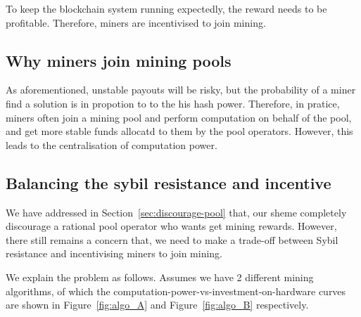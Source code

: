 To keep the blockchain system running expectedly, the reward needs to be profitable.
Therefore, miners are incentivised to join mining.

\subsection{Why miners join mining pools}



As aforementioned, unstable payouts will be risky, but the probability of a miner find a solution is in propotion to to the his hash power.
Therefore, in pratice, miners often join a mining pool and perform computation on behalf of the pool, and get more stable funds allocatd to them by the pool operators.
However, this leads to the centralisation of computation power.

\subsection{Balancing the sybil resistance and incentive}

We have addressed in Section~\ref{sec:discourage-pool} that, our sheme completely discourage a rational pool operator who wants get mining rewards.
However, there still remains a concern that, we need to make a trade-off between Sybil resistance and incentivising miners to join mining.




We explain the problem as follows. Assumes we have 2 different mining algorithms, of which the computation-power-vs-investment-on-hardware curves are shown in Figure~\ref{fig:algo_A} and Figure~\ref{fig:algo_B} respectively.

